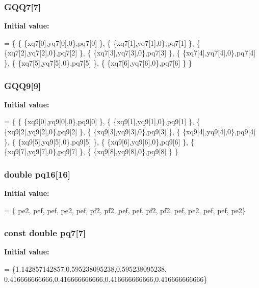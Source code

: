 \subsubsection[{G\-Q\-Q7}]{ G\-Q\-Q7[7]}\label{GaussQuadratureQuad_8cc_a701651c6fee7ab3f7d6720575c23d303}
{\bfseries Initial value\-:}
\begin{DoxyCode}
= \{
  \{ \{xq7[0],yq7[0],0\},pq7[0] \},
  \{ \{xq7[1],yq7[1],0\},pq7[1] \},
  \{ \{xq7[2],yq7[2],0\},pq7[2] \},
  \{ \{xq7[3],yq7[3],0\},pq7[3] \},
  \{ \{xq7[4],yq7[4],0\},pq7[4] \},
  \{ \{xq7[5],yq7[5],0\},pq7[5] \},
  \{ \{xq7[6],yq7[6],0\},pq7[6] \}
\}
\end{DoxyCode}
\subsubsection[{G\-Q\-Q9}]{ G\-Q\-Q9[9]}\label{GaussQuadratureQuad_8cc_a679401d9a58221e45dbc13556f8cb47d}
{\bfseries Initial value\-:}
\begin{DoxyCode}
= \{
  \{ \{xq9[0],yq9[0],0\},pq9[0] \},
  \{ \{xq9[1],yq9[1],0\},pq9[1] \},
  \{ \{xq9[2],yq9[2],0\},pq9[2] \},
  \{ \{xq9[3],yq9[3],0\},pq9[3] \},
  \{ \{xq9[4],yq9[4],0\},pq9[4] \},
  \{ \{xq9[5],yq9[5],0\},pq9[5] \},
  \{ \{xq9[6],yq9[6],0\},pq9[6] \},
  \{ \{xq9[7],yq9[7],0\},pq9[7] \},
  \{ \{xq9[8],yq9[8],0\},pq9[8] \}
\}
\end{DoxyCode}
\subsubsection[{pq16}]{\setlength{\rightskip}{0pt plus 5cm}double pq16[16]}\label{GaussQuadratureQuad_8cc_a20d2f4df342cb9a301810b0c933bd33f}
{\bfseries Initial value\-:}
\begin{DoxyCode}
= \{ pe2, pef,  pef, pe2, pef, pf2, pf2, pef, 
                    pef, pf2, pf2, pef, pe2, pef, pef, pe2\}
\end{DoxyCode}
\subsubsection[{pq7}]{\setlength{\rightskip}{0pt plus 5cm}const double pq7[7]}\label{GaussQuadratureQuad_8cc_a79446c762c132d61207b8d8cb9857406}
{\bfseries Initial value\-:}
\begin{DoxyCode}
= \{1.142857142857,0.595238095238,0.595238095238,
                       0.416666666666,0.416666666666,0.416666666666,0.416666666666\}
\end{DoxyCode}
